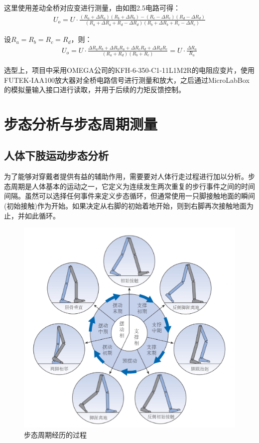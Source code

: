 这里使用差动全桥对应变进行测量，由如图2.5电路可得：
\begin{align}
U_o = U\cdot \frac{(R_a + \Delta R_a)(R_b + \Delta R_b) - (R_c - \Delta R_c)(R_d - \Delta R_d)}{(R_a + \Delta R_a + R_d - \Delta R_d)(R_b + \Delta R_b + R_c - \Delta R_c)}
\end{align}

设$R_a = R_b = R_c = R_d$，则：
\begin{align}
U_o = U\cdot \frac{\Delta R_a R_b + \Delta R_b R_a + \Delta R_c R_d + \Delta R_d R_c}{(R_a + R_d)(R_b + R_c)}= U\cdot \frac{\Delta R_a}{R_a}
\end{align}

选型上，项目中采用OMEGA公司的KFH-6-350-C1-11L1M2R的电阻应变片，使用FUTEK-IAA100放大器对全桥电路信号进行测量和放大，之后通过MicroLabBox的模拟量输入接口进行读取，并用于后续的力矩反馈控制。

\section{步态分析与步态周期测量}
\subsection{人体下肢运动步态分析}

为了能够对穿戴者提供有益的辅助作用，需要要对人体行走过程进行加以分析。步态周期是人体基本的运动之一，它定义为连续发生两次重复的步行事件之间的时间间隔。虽然可以选择任何事件来定义步态循环，但通常使用一只脚接触地面的瞬间(初始接触)作为开始。如果决定从右脚的初始着地开始，则到右脚再次接触地面为止，并如此循环。

\begin{figure}[htb]
    \includegraphics[width=14cm]{fig/f29.jpg}
    \caption{步态周期经历的过程}
    \label{fig:mark}
\end{figure}

